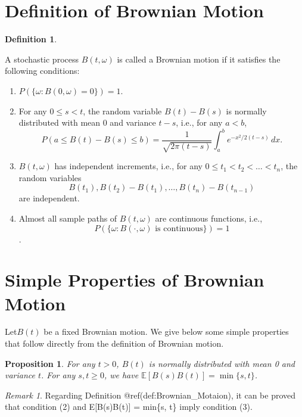 \documentclass[
]{book}
\providecommand{\tightlist}{%
  \setlength{\itemsep}{0pt}\setlength{\parskip}{0pt}}
\newtheorem{proposition}{Proposition}[chapter]
\theoremstyle{definition}
\newtheorem{definition}{Definition}[chapter]
\theoremstyle{definition}
\theoremstyle{definition}
\theoremstyle{definition}
\theoremstyle{remark}
\newtheorem*{remark}{Remark}
\begin{document}
\section{Definition of Brownian Motion}\label{definition-of-brownian-motion}

\begin{definition}
\protect\hypertarget{def:Brownian_Motaion}{}\label{def:Brownian_Motaion}

A stochastic process \(B(t, \omega)\) is called a Brownian motion if it satisfies the following conditions:

\begin{enumerate}
\def\labelenumi{\arabic{enumi}.}
\tightlist
\item
  \(P(\{\omega : B(0, \omega) = 0\}) = 1\).
\item
  For any \(0 \leq s < t\), the random variable \(B(t) - B(s)\) is normally distributed with mean 0 and variance \(t - s\), i.e., for any \(a < b\),
  \[
  P(a \leq B(t) - B(s) \leq b) = \frac{1}{\sqrt{2\pi(t - s)}} \int_a^b e^{-x^2/2(t - s)} \, dx.
  \]
\item
  \(B(t, \omega)\) has independent increments, i.e., for any \(0 \leq t_1 < t_2 < \ldots < t_n\), the random variables
  \[B(t_1), B(t_2) - B(t_1), \ldots, B(t_n) - B(t_{n-1})\]
  are independent.
\item
  Almost all sample paths of \(B(t, \omega)\) are continuous functions, i.e.,
  \[P(\{\omega : B(\cdot, \omega) \text{ is continuous}\}) = 1\].
\end{enumerate}

\end{definition}

\section{Simple Properties of Brownian Motion}\label{simple-properties-of-brownian-motion}

Let\(B(t)\) be a fixed Brownian motion. We give below some simple properties that follow directly from the definition of Brownian motion.

\begin{proposition}
\protect\hypertarget{prp:unnamed-chunk-2}{}\label{prp:unnamed-chunk-2}For any \(t > 0\), \(B(t)\) is normally distributed with mean 0 and variance \(t\). For any \(s, t \geq 0\), we have \(\mathbb{E}[B(s)B(t)] = \min\{s, t\}\).
\end{proposition}

\begin{remark}
Regarding Definition @ref(def:Brownian\_Motaion), it can be proved that condition (2) and E{[}B(s)B(t){]} = min\{s, t\} imply condition (3).
\end{remark}
\end{document}
